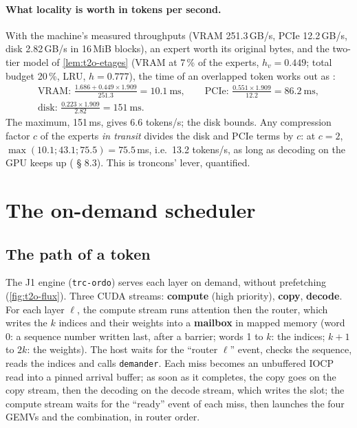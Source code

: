 \paragraph{What locality is worth in tokens per second.} With the machine's measured throughputs (VRAM 251.3\,GB/s, PCIe 12.2\,GB/s, disk 2.82\,GB/s in 16\,MiB blocks), an expert worth its original bytes, and the two-tier model of \cref{lem:t2o-etages} (VRAM at 7\,\% of the experts, $h_v = 0.449$; total budget 20\,\%, LRU, $h = 0.777$), the time of an overlapped token works out as \calc:
\begin{gather*}
\text{VRAM: } \frac{1.686 + 0.449 \times 1.909}{251.3} = 10.1~\text{ms}, \qquad
\text{PCIe: } \frac{0.551 \times 1.909}{12.2} = 86.2~\text{ms}, \\
\text{disk: } \frac{0.223 \times 1.909}{2.82} = 151~\text{ms}.
\end{gather*}
The maximum, 151\,ms, gives 6.6 tokens/s; the disk bounds. Any compression factor $c$ of the experts \emph{in transit} divides the disk and PCIe terms by $c$: at $c = 2$, $\max(10.1; 43.1; 75.5) = 75.5$\,ms, i.e.\ 13.2 tokens/s, as long as decoding on the GPU keeps up ( § 8.3). This is troncons' lever, quantified.

\section{The on-demand scheduler}\label{sec:t2o-ordo}

\subsection{The path of a token}

The J1 engine (\texttt{trc-ordo}) serves each layer on demand, without prefetching (\cref{fig:t2o-flux}). Three CUDA streams: \textbf{compute} (high priority), \textbf{copy}, \textbf{decode}. For each layer $\ell$, the compute stream runs attention then the router, which writes the $k$ indices and their weights into a \textbf{mailbox} in mapped memory (word 0: a sequence number written last, after a barrier; words 1 to $k$: the indices; $k+1$ to $2k$: the weights). The host waits for the \enquote{router $\ell$} event, checks the sequence, reads the indices and calls \texttt{demander}. Each miss becomes an unbuffered IOCP read into a pinned arrival buffer; as soon as it completes, the copy goes on the copy stream, then the decoding on the decode stream, which writes the slot; the compute stream waits for the \enquote{ready} event of each miss, then launches the four GEMVs and the combination, in router order.

